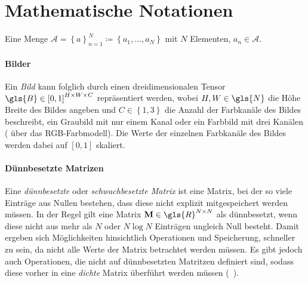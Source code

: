 \section{Mathematische Notationen}
\label{mathematische_notationen}



Eine Menge $\mathcal{A} = {\left\{a\right\}}_{n=1}^N \coloneqq \left\{a_1, \ldots, a_N\right\}$ mit $N$ Elementen, $a_n \in \mathcal{A}$.

\paragraph{Bilder}

Ein \emph{Bild} kann folglich durch einen dreidimensionalen Tensor $\gls{B} \in {\left[0, 1\right]}^{H \times W \times C}$ repräsentiert werden, wobei $H, W \in \gls{N}$ die Höhe \bzw{} Breite des Bildes angeben und $C \in \left\{1, 3\right\}$ die Anzahl der Farbkanäle des Bildes beschreibt, \dhe{} ein Graubild mit nur einem Kanal oder ein Farbbild mit drei Kanälen (\zB{} über das RGB-Farbmodell).
Die Werte der einzelnen Farbkanäle des Bildes werden dabei auf $\left[0, 1\right]$ skaliert.

\paragraph{Dünnbesetzte Matrizen}

Eine \emph{dünnbesetzte} oder \emph{schwachbesetzte Matrix} ist eine Matrix, bei der so viele Einträge aus Nullen bestehen, dass diese nicht explizit mitgespeichert werden müssen.
In der Regel gilt eine Matrix $\ma{M}\in \gls{R}^{N \times N}$ als dünnbesetzt, wenn diese nicht aus mehr als $N$ oder $N \log N$ Einträgen ungleich Null besteht.
Damit ergeben sich Möglichkeiten hinsichtlich Operationen und Speicherung, schneller zu sein, da nicht alle Werte der Matrix betrachtet werden müssen.
Es gibt jedoch auch Operationen, die nicht auf dünnbesetzten Matritzen definiert sind, sodass diese vorher in eine \emph{dichte} Matrix überführt werden müssen (\vgl{}~\cite{Saad}).
